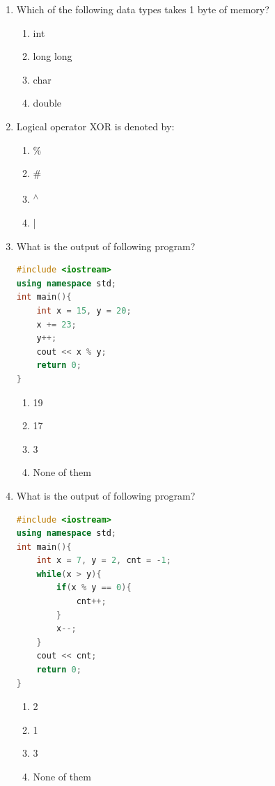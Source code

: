 \documentclass[10pt]{article}
\begin{document}
\begin{enumerate}

\item Which of the following data types takes 1 byte of memory?
\begin{multicols}{4}
\begin{enumerate}
    \item int
    \item long long
    \item char 
    \item double
\end{enumerate}
\end{multicols}

\item Logical operator XOR is denoted by:
\begin{multicols}{4}
\begin{enumerate}
    \item \%
    \item \#
    \item \textsuperscript{$\wedge$} 
    \item |
\end{enumerate}
\end{multicols}



\item What is the output of following program?
\begin{lstlisting}[language=C++]
#include <iostream>
using namespace std;
int main(){
    int x = 15, y = 20;
    x += 23;
    y++;
    cout << x % y;
    return 0;
}

\end{lstlisting}
\begin{multicols}{4}
\begin{enumerate}
    \item 19
    \item 17
    \item 3
    \item None of them
\end{enumerate}
\end{multicols}

\item What is the output of following program?
\begin{lstlisting}[language=C++]
#include <iostream>
using namespace std;
int main(){
    int x = 7, y = 2, cnt = -1;
    while(x > y){
        if(x % y == 0){
            cnt++;
        }
        x--;
    }
    cout << cnt;
    return 0;
}
\end{lstlisting}
\begin{multicols}{4}
\begin{enumerate}
    \item 2
    \item 1
    \item 3
    \item None of them
\end{enumerate}
\end{multicols}



\end{enumerate}
\end{document}
